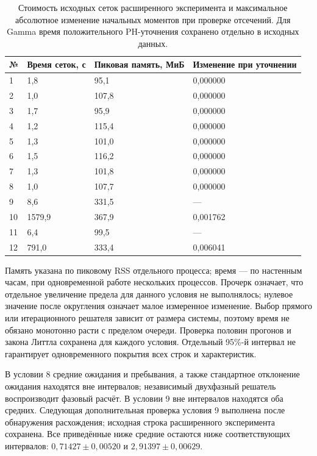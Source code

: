 \documentclass[a4paper,12pt]{article}
\begin{document}
\begin{table}[!htbp]
\centering\small\setlength{\tabcolsep}{2pt}
\begin{tabular}{@{}p{0.94cm}p{4.25cm}p{4.72cm}p{5.67cm}@{}}
\toprule
№ & Время сеток, с & Пиковая память, МиБ & Изменение при уточнении \\
\midrule
1 & 1,8 & 95,1 & 0,000000 \\
2 & 1,0 & 107,8 & 0,000000 \\
3 & 1,7 & 95,9 & 0,000000 \\
4 & 1,2 & 115,4 & 0,000000 \\
5 & 1,3 & 101,0 & 0,000000 \\
6 & 1,5 & 116,2 & 0,000000 \\
7 & 1,3 & 101,8 & 0,000000 \\
8 & 1,0 & 107,7 & 0,000000 \\
9 & 8,6 & 331,5 & — \\
10 & 1579,9 & 367,9 & 0,001762 \\
11 & 6,4 & 99,5 & — \\
12 & 791,0 & 333,4 & 0,006041 \\
\bottomrule
\end{tabular}
\caption{Стоимость исходных сеток расширенного эксперимента и максимальное абсолютное изменение начальных моментов при проверке отсечений. Для Gamma время положительного PH-уточнения сохранено отдельно в исходных данных.}
\label{tab:cost}
\end{table}

Память указана по пиковому RSS отдельного процесса; время --- по настенным часам, при одновременной работе нескольких процессов. Прочерк означает, что отдельное увеличение предела для данного условия не выполнялось; нулевое значение после округления означает малое измеренное изменение. Выбор прямого или итерационного решателя зависит от размера системы, поэтому время не обязано монотонно расти с пределом очереди. Проверка половин прогонов и закона Литтла сохранена для каждого условия. Отдельный 95\%-й интервал не гарантирует одновременного покрытия всех строк и характеристик.

В условии 8 средние ожидания и пребывания, а также стандартное отклонение ожидания находятся вне интервалов; независимый двухфазный решатель воспроизводит фазовый расчёт. В условии 9 вне интервалов находятся оба средних. Следующая дополнительная проверка условия 9 выполнена после обнаружения расхождения; исходная строка расширенного эксперимента сохранена. Все приведённые ниже средние остаются ниже соответствующих интервалов: \(0{,}71427\pm0{,}00520\) и \(2{,}91397\pm0{,}00629\).
\end{document}
